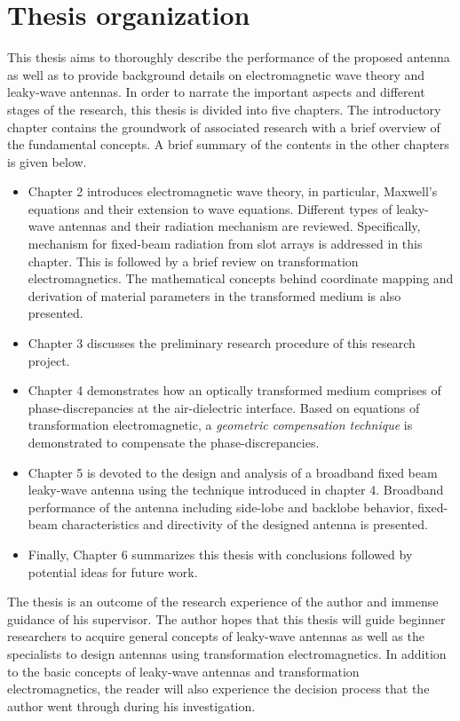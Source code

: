 \section{Thesis organization}
This thesis aims to thoroughly describe the performance of the proposed antenna as well as to provide background details on electromagnetic wave theory and leaky-wave antennas. In order to narrate the important aspects and different stages of the research, this thesis is divided into five chapters. The introductory chapter contains the groundwork of associated research with a brief overview of the fundamental concepts. A brief summary of the contents in the other chapters is given below.
\begin{itemize}
    \item Chapter 2 introduces electromagnetic wave theory, in particular, Maxwell's equations and their extension to wave equations. Different types of leaky-wave antennas and their radiation mechanism are reviewed. Specifically, mechanism for fixed-beam radiation from slot arrays is addressed in this chapter.  This is followed by a brief review on transformation electromagnetics. The mathematical concepts behind coordinate mapping and derivation of material parameters in the transformed medium is also presented. 
    \item Chapter 3 discusses the preliminary research procedure of this research project. 
    \item Chapter 4 demonstrates how an optically transformed medium comprises of phase-discrepancies at the air-dielectric interface. Based on equations of transformation electromagnetic, a \textit{geometric compensation technique} is demonstrated to compensate the phase-discrepancies. 
    \item Chapter 5 is devoted to the design and analysis of a broadband fixed beam leaky-wave antenna using the technique introduced in chapter 4. Broadband performance of the antenna including side-lobe and backlobe behavior, fixed-beam characteristics and directivity of the designed antenna is presented. 
    \item Finally, Chapter 6 summarizes this thesis with conclusions followed by potential ideas for future work.
\end{itemize}

The thesis is an outcome of the research experience of the author and immense guidance of his supervisor. The author hopes that this thesis will guide beginner researchers to acquire general concepts of leaky-wave antennas as well as the specialists to design antennas using transformation electromagnetics. In addition to the basic concepts of leaky-wave antennas and transformation electromagnetics, the reader will also experience the decision process that the author went through during his investigation.
